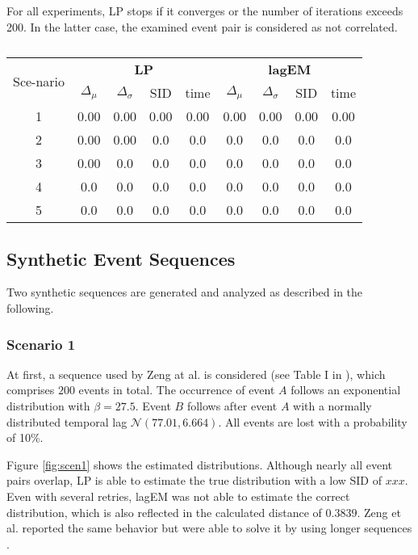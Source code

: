 \documentclass[journal, 10pt]{IEEEtran}
\begin{document}
For all experiments, LP stops if it converges or the number of iterations exceeds 200. In the latter case, the examined event pair is considered as not correlated.

\begin{table}%
\centering
\caption{}
\label{}
\begin{tabular}{c|cccc|cccc}
\multirow{2}{5mm}{Sce-nario} & \multicolumn{4}{c|}{\textbf{LP}} & \multicolumn{4}{c}{\textbf{lagEM}}
\\
 & $\Delta_\mu$ & $\Delta_\sigma$ & SID & time & $\Delta_\mu$ & $\Delta_\sigma$ & SID & time
\\ \hline
 1 & 0.00 & 0.00 & 0.00 & 0.00 & 0.00 & 0.00 & 0.00 & 0.00
\\
 2 & 0.00 & 0.00 & 0.0 & 0.0 & 0.0 & 0.0 & 0.0 & 0.0
\\ \hline
 3 & 0.00 & 0.0 & 0.0 & 0.0 & 0.0 & 0.0 & 0.0 & 0.0
\\
 4 & 0.0 & 0.0 & 0.0 & 0.0 & 0.0 & 0.0 & 0.0 & 0.0
\\
 5 & 0.0 & 0.0 & 0.0 & 0.0 & 0.0 & 0.0 & 0.0 & 0.0
\end{tabular}
\end{table}


\subsection{Synthetic Event Sequences}
\label{sec:results_synthetic}
%
Two synthetic sequences are generated and analyzed as described in the following.

\subsubsection{Scenario 1}
At first, a sequence used by Zeng at al. is considered (see Table I in \cite{Zeng2015}), which comprises $200$ events in total. The occurrence of event $A$ follows an exponential distribution with $\beta = 27.5$. Event $B$ follows after event $A$ with a normally distributed temporal lag $\mathcal{N}(77.01, 6.664)$. All events are lost with a probability of 10\%.

Figure \ref{fig:scen1} shows the estimated distributions. Although nearly all event pairs overlap, LP is able to estimate the true distribution with a low SID of $xxx$. Even with several retries, lagEM was not able to estimate the correct distribution, which is also reflected in the calculated distance of $0.3839$. Zeng et al. reported the same behavior but were able to solve it by using longer sequences \cite{Zeng2015}.
\end{document}
